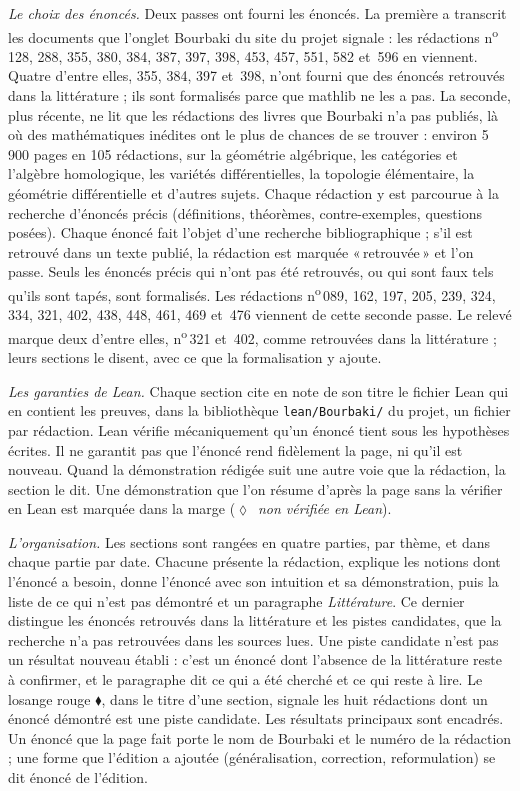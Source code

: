 \documentclass[11pt]{article}
\newcommand{\q}[1]{«\,#1\,»}
\newcommand{\redac}[1]{n\textsuperscript{o}\,#1}
\theoremstyle{plain}
\theoremstyle{definition}
\theoremstyle{plain}
\theoremstyle{definition}
\theoremstyle{remark}
\renewcommand{\_}{\bkunderscore\allowbreak}
\begin{document}
\emph{Le choix des énoncés.} Deux passes ont fourni les énoncés. La première a transcrit les documents que l'onglet Bourbaki du site du projet signale : les rédactions \redac{128}, 288, 355, 380, 384, 387, 397, 398, 453, 457, 551, 582 et~596 en viennent. Quatre d'entre elles, 355, 384, 397 et~398, n'ont fourni que des énoncés retrouvés dans la littérature ; ils sont formalisés parce que mathlib ne les a pas. La seconde, plus récente, ne lit que les rédactions des livres que Bourbaki n'a pas publiés, là où des mathématiques inédites ont le plus de chances de se trouver : environ 5\,900 pages en 105 rédactions, sur la géométrie algébrique, les catégories et l'algèbre homologique, les variétés différentielles, la topologie élémentaire, la géométrie différentielle et d'autres sujets. Chaque rédaction y est parcourue à la recherche d'énoncés précis (définitions, théorèmes, contre-exemples, questions posées). Chaque énoncé fait l'objet d'une recherche bibliographique ; s'il est retrouvé dans un texte publié, la rédaction est marquée \q{retrouvée} et l'on passe. Seuls les énoncés précis qui n'ont pas été retrouvés, ou qui sont faux tels qu'ils sont tapés, sont formalisés. Les rédactions \redac{089}, 162, 197, 205, 239, 324, 334, 321, 402, 438, 448, 461, 469 et~476 viennent de cette seconde passe. Le relevé marque deux d'entre elles, \redac{321} et~402, comme retrouvées dans la littérature ; leurs sections le disent, avec ce que la formalisation y ajoute.

\emph{Les garanties de Lean.} Chaque section cite en note de son titre le fichier Lean qui en contient les preuves, dans la bibliothèque \texttt{lean/Bourbaki/} du projet, un fichier par rédaction. Lean vérifie mécaniquement qu'un énoncé tient sous les hypothèses écrites. Il ne garantit pas que l'énoncé rend fidèlement la page, ni qu'il est nouveau. Quand la démonstration rédigée suit une autre voie que la rédaction, la section le dit. Une démonstration que l'on résume d'après la page sans la vérifier en Lean est marquée dans la marge (\textcolor{piste}{\ensuremath{\lozenge}}~\emph{non vérifiée en Lean}).

\emph{L'organisation.} Les sections sont rangées en quatre parties, par thème, et dans chaque partie par date. Chacune présente la rédaction, explique les notions dont l'énoncé a besoin, donne l'énoncé avec son intuition et sa démonstration, puis la liste de ce qui n'est pas démontré et un paragraphe \emph{Littérature}. Ce dernier distingue les énoncés retrouvés dans la littérature et les pistes candidates, que la recherche n'a pas retrouvées dans les sources lues. Une piste candidate n'est pas un résultat nouveau établi : c'est un énoncé dont l'absence de la littérature reste à confirmer, et le paragraphe dit ce qui a été cherché et ce qui reste à lire. Le losange rouge \textcolor{piste}{\ensuremath{\blacklozenge}}, dans le titre d'une section, signale les huit rédactions dont un énoncé démontré est une piste candidate. Les résultats principaux sont encadrés. Un énoncé que la page fait porte le nom de Bourbaki et le numéro de la rédaction ; une forme que l'édition a ajoutée (généralisation, correction, reformulation) se dit énoncé de l'édition.
\end{document}
